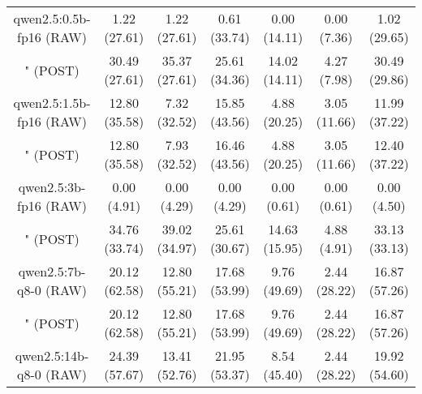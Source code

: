 \begin{table}[]
{\begin{tabular}{ccccccc}
        \multicolumn{1}{c|}{qwen2.5:0.5b-fp16 (RAW)} & 1.22 (27.61) & 1.22 (27.61) & \multicolumn{1}{c|}{0.61 (33.74)} & 0.00 (14.11) & \multicolumn{1}{c|}{0.00 (7.36)} & 1.02 (29.65) \\
        
        

        \multicolumn{1}{c|}{" (POST)} & 30.49 (27.61) & 35.37 (27.61) & \multicolumn{1}{c|}{25.61 (34.36)} & 14.02 (14.11) & \multicolumn{1}{c|}{4.27 (7.98)} & 30.49 (29.86) \\
        \cline{1-7}
        

        \multicolumn{1}{c|}{qwen2.5:1.5b-fp16 (RAW)} & 12.80 (35.58) & 7.32 (32.52) & \multicolumn{1}{c|}{15.85 (43.56)} & 4.88 (20.25) & \multicolumn{1}{c|}{3.05 (11.66)} & 11.99 (37.22) \\
        
        

        \multicolumn{1}{c|}{" (POST)} & 12.80 (35.58) & 7.93 (32.52) & \multicolumn{1}{c|}{16.46 (43.56)} & 4.88 (20.25) & \multicolumn{1}{c|}{3.05 (11.66)} & 12.40 (37.22) \\
        \cline{1-7}
        

        \multicolumn{1}{c|}{qwen2.5:3b-fp16 (RAW)} & 0.00 (4.91) & 0.00 (4.29) & \multicolumn{1}{c|}{0.00 (4.29)} & 0.00 (0.61) & \multicolumn{1}{c|}{0.00 (0.61)} & 0.00 (4.50) \\
        
        

        \multicolumn{1}{c|}{" (POST)} & 34.76 (33.74) & 39.02 (34.97) & \multicolumn{1}{c|}{25.61 (30.67)} & 14.63 (15.95) & \multicolumn{1}{c|}{4.88 (4.91)} & 33.13 (33.13) \\
        \cline{1-7}
        

        \multicolumn{1}{c|}{qwen2.5:7b-q8-0 (RAW)} & 20.12 (62.58) & 12.80 (55.21) & \multicolumn{1}{c|}{17.68 (53.99)} & 9.76 (49.69) & \multicolumn{1}{c|}{2.44 (28.22)} & 16.87 (57.26) \\
        
        

        \multicolumn{1}{c|}{" (POST)} & 20.12 (62.58) & 12.80 (55.21) & \multicolumn{1}{c|}{17.68 (53.99)} & 9.76 (49.69) & \multicolumn{1}{c|}{2.44 (28.22)} & 16.87 (57.26) \\
        \cline{1-7}
        

        \multicolumn{1}{c|}{qwen2.5:14b-q8-0 (RAW)} & 24.39 (57.67) & 13.41 (52.76) & \multicolumn{1}{c|}{21.95 (53.37)} & 8.54 (45.40) & \multicolumn{1}{c|}{2.44 (28.22)} & 19.92 (54.60) \\
        

\end{tabular}}
\end{table}
